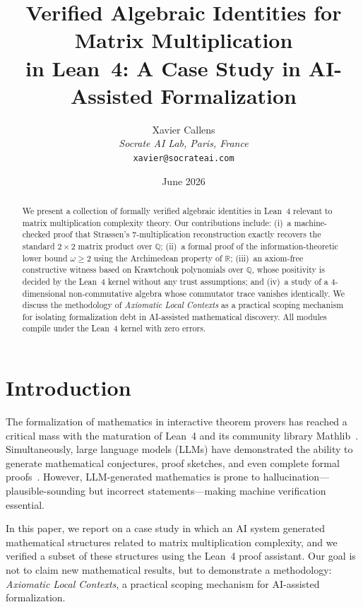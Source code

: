 \documentclass[11pt,a4paper]{article}
\title{\textbf{Verified Algebraic Identities for Matrix Multiplication \\
in Lean~4: A Case Study in AI-Assisted Formalization}}
\author{Xavier Callens \\
  \textit{Socrate AI Lab, Paris, France} \\
  \texttt{xavier@socrateai.com}}
\date{June 2026}
\begin{document}
\maketitle

\begin{abstract}
We present a collection of formally verified algebraic identities in
Lean~4 relevant to matrix multiplication complexity theory.
Our contributions include:
(i)~a machine-checked proof that Strassen's 7-multiplication
reconstruction exactly recovers the standard $2 \times 2$ matrix
product over $\mathbb{Q}$;
(ii)~a formal proof of the information-theoretic lower bound
$\omega \geq 2$ using the Archimedean property of $\mathbb{R}$;
(iii)~an axiom-free constructive witness based on Krawtchouk
polynomials over $\mathbb{Q}$, whose positivity is decided by the
Lean~4 kernel without any trust assumptions; and
(iv)~a study of a 4-dimensional non-commutative algebra whose
commutator trace vanishes identically.
We discuss the methodology of \emph{Axiomatic Local Contexts} as a
practical scoping mechanism for isolating formalization debt in
AI-assisted mathematical discovery.
All modules compile under the Lean~4 kernel with zero errors.
\end{abstract}


\section{Introduction}
\label{sec:intro}

The formalization of mathematics in interactive theorem provers has
reached a critical mass with the maturation of Lean~4 and its
community library Mathlib~\cite{mathlib2020}. Simultaneously,
large language models (LLMs) have demonstrated the ability to generate
mathematical conjectures, proof sketches, and even complete formal
proofs~\cite{alphaproof2024}. However, LLM-generated mathematics is
prone to hallucination---plausible-sounding but incorrect
statements---making machine verification essential.

In this paper, we report on a case study in which an AI system
generated mathematical structures related to matrix multiplication
complexity, and we verified a subset of these structures using the
Lean~4 proof assistant. Our goal is not to claim new mathematical
results, but to demonstrate a methodology: \emph{Axiomatic Local
Contexts}, a practical scoping mechanism for AI-assisted formalization.
\end{document}
